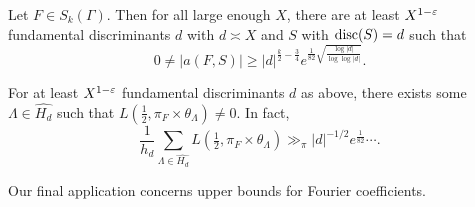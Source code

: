 \documentclass[reqno]{amsart} 
\begin{document}
\begin{theorem} \label{theorem:cnfg5kcowe}
  Let $F \in S_k(\Gamma)$.  Then for all large enough $X$, there are at least $X^{1 - \varepsilon}$ fundamental discriminants $d$ with $d \asymp X$ and $S$ with $\operatorname{disc}(S) = d$ such that
  \begin{equation*}
    0 \neq \lvert a(F, S) \rvert \geq \lvert d \rvert^{\frac{k}{2} - \frac{3}{4}}
    e^{\frac{1}{82} \sqrt{\frac{\log \lvert d \rvert}{\log \log \lvert d \rvert}}}.    
  \end{equation*}
\end{theorem}
\begin{corollary}\label{corollary:cnfg5kcqax}
  For at least $X^{1 - \varepsilon}$ fundamental discriminants $d$ as above, there exists some $\Lambda \in \widehat{H_d}$ such that $L(\tfrac{1}{2}, \pi_F \times \theta_\Lambda) \neq 0$.  In fact,
  \begin{equation*}
    \frac{1}{h_d } \sum_{\Lambda \in \widehat{H_d}} L(\tfrac{1}{2}, \pi_F \times \theta_\Lambda) \gg_\pi \lvert d \rvert^{-1/2} e^{\frac{1}{82}} \dotsb.
  \end{equation*}
\end{corollary}

Our final application concerns upper bounds for Fourier coefficients.





{} 
\end{document}

